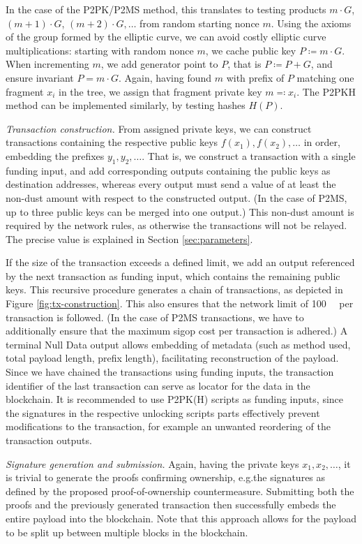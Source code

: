 \documentclass[a4paper,11pt,titlepage]{scrbook}
\begin{document}
In the case of the P2PK/P2MS method, this translates to testing products $m\cdot G$, $(m{+}1)\cdot G$, $(m{+}2)\cdot G,\dots$ from random starting nonce $m$.
Using the axioms of the group formed by the elliptic curve, we can avoid costly elliptic curve multiplications: starting with random nonce $m$, we cache public key $P\coloneqq m\cdot G$.
When incrementing $m$, we add generator point to $P$, that is $P\coloneqq P+G$, and ensure invariant $P= m\cdot G$.
Again, having found $m$ with prefix of $P$ matching one fragment $x_i$ in the tree, we assign that fragment private key $m\eqqcolon x_i$.
The P2PKH method can be implemented similarly, by testing hashes $H(P)$.

\emph{Transaction construction.}
From assigned private keys, we can construct transactions containing the respective public keys $f(x_1), f(x_2), \dots$ in order, embedding the prefixes $y_1, y_2, \dots$.
That is, we construct a transaction with a single funding input, and add corresponding outputs containing the public keys as destination addresses, whereas every output must send a value of at least the non-dust amount with respect to the constructed output. (In the case of P2MS, up to three public keys can be merged into one output.)
This non-dust amount is required by the network rules, as otherwise the transactions will not be relayed.
The precise value is explained in Section \ref{sec:parameters}.


If the size of the transaction exceeds a defined limit, we add an output referenced by the next transaction as funding input, which contains the remaining public keys. This recursive procedure generates a chain of transactions, as depicted in Figure \ref{fig:tx-construction}.
This also ensures that the network limit of \SI{100}{\kilo\byte} per transaction is followed.
(In the case of P2MS transactions, we have to additionally ensure that the maximum sigop cost per transaction is adhered.)
A terminal Null Data output allows embedding of metadata (such as method used, total payload length, prefix length), facilitating reconstruction of the payload.
Since we have chained the transactions using funding inputs, the transaction identifier of the last transaction can serve as locator for the data in the blockchain.
It is recommended to use P2PK(H) scripts as funding inputs, since the signatures in the respective unlocking scripts parts effectively prevent modifications to the transaction, for example an unwanted reordering of the transaction outputs.

\emph{Signature generation and submission.}
Again, having the private keys $x_1, x_2, \dots$, it is trivial to generate the proofs confirming ownership, e.g.\@ the signatures as defined by the proposed proof-of-ownership countermeasure.
Submitting both the proofs and the previously generated transaction then successfully embeds the entire payload into the blockchain.
Note that this approach allows for the payload to be split up between multiple blocks in the blockchain.
\end{document}
